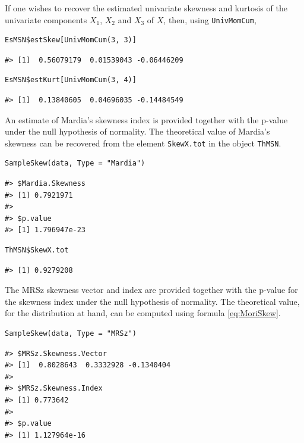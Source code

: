 If one wishes to recover the estimated univariate skewness and kurtosis of the univariate components \(X_1\), \(X_2\) and \(X_3\) of \(X\), then, using \texttt{UnivMomCum},

\begin{verbatim}
EsMSN$estSkew[UnivMomCum(3, 3)]
\end{verbatim}

\begin{verbatim}
#> [1]  0.56079179  0.01539043 -0.06446209
\end{verbatim}

\begin{verbatim}
EsMSN$estKurt[UnivMomCum(3, 4)] 
\end{verbatim}

\begin{verbatim}
#> [1]  0.13840605  0.04696035 -0.14484549
\end{verbatim}

An estimate of Mardia's skewness index is provided together with the p-value under the null hypothesis of normality. The theoretical value of Mardia's skewness can be recovered from the element \texttt{SkewX.tot} in the object \texttt{ThMSN}.

\begin{verbatim}
SampleSkew(data, Type = "Mardia")
\end{verbatim}

\begin{verbatim}
#> $Mardia.Skewness
#> [1] 0.7921971
#> 
#> $p.value
#> [1] 1.796947e-23
\end{verbatim}

\begin{verbatim}
ThMSN$SkewX.tot
\end{verbatim}

\begin{verbatim}
#> [1] 0.9279208
\end{verbatim}

The MRSz skewness vector and index are provided together with the p-value for the skewness index under the null hypothesis of normality. The theoretical value, for the distribution at hand, can be computed using formula \eqref{eq:MoriSkew}.

\begin{verbatim}
SampleSkew(data, Type = "MRSz")
\end{verbatim}

\begin{verbatim}
#> $MRSz.Skewness.Vector
#> [1]  0.8028643  0.3332928 -0.1340404
#> 
#> $MRSz.Skewness.Index
#> [1] 0.773642
#> 
#> $p.value
#> [1] 1.127964e-16
\end{verbatim}

